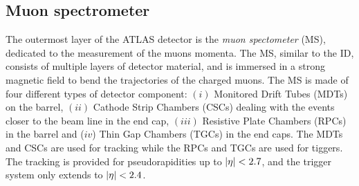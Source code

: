 \documentclass[14pt, a4paper]{book}
\begin{document}
\subsection{Muon spectrometer}\label{sec:MS}
The outermost layer of the ATLAS detector is the \textit{muon spectometer} (MS), dedicated to the measurement of the muons momenta. The MS, similar to the ID, consists of multiple layers of detector material, 
and is immersed in a strong magnetic field to bend the trajectories of the charged muons. The MS is made of four different types of detector component: $(i)$ Monitored Drift Tubes (MDTs) on the barrel, 
$(ii)$ Cathode Strip Chambers (CSCs) dealing with the events closer to the beam line in the end cap, $(iii)$ Resistive Plate Chambers (RPCs) in the barrel and ($iv$) Thin Gap Chambers (TGCs) in the end caps. 
The MDTs and CSCs are used for tracking while the RPCs and TGCs are used for tiggers. The tracking is provided for pseudorapidities up to $\abs{\eta}<2.7$, and the trigger system only extends to $\abs{\eta}<2.4$.
\end{document}
